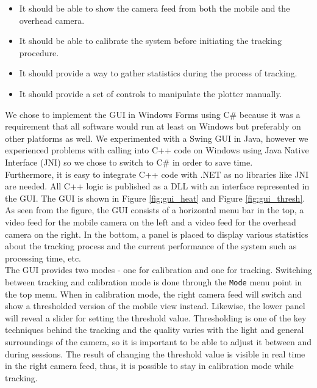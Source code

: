\begin{itemize}
  \item{It should be able to show the camera feed from both the mobile and the overhead camera}.
  \item{It should be able to calibrate the system before initiating the tracking procedure}.
  \item{It should provide a way to gather statistics during the process of tracking}.
  \item{It should provide a set of controls to manipulate the plotter manually}.
\end{itemize}

We chose to implement the GUI in Windows Forms using C\# because it was a requirement that all software would run at least on Windows but preferably on other platforms as well. We experimented with a Swing GUI in Java, however we experienced problems with calling into C++ code on Windows using Java Native Interface (JNI) \cite{jni} so we chose to switch to C\# in order to save time. \\

Furthermore, it is easy to integrate C++ code with .NET as no libraries like JNI are needed. All C++ logic is published as a DLL with an interface represented in the GUI. The GUI is shown in Figure \ref{fig:gui_heat} and Figure \ref{fig:gui_thresh}. \\

As seen from the figure, the GUI consists of a horizontal menu bar in the top, a video feed for the mobile camera on the left and a video feed for the overhead camera on the right. In the bottom, a panel is placed to display various statistics about the tracking process and the current performance of the system such as processing time, etc. \\

The GUI provides two modes - one for calibration and one for tracking. Switching between tracking and calibration mode is done through the \texttt{Mode} menu point in the top menu. When in calibration mode, the right camera feed will switch and show a thresholded version of the mobile view instead. Likewise, the lower panel will reveal a slider for setting the threshold value. Thresholding is one of the key techniques behind the tracking and the quality varies with the light and general surroundings of the camera, so it is important to be able to adjust it between and during sessions. The result of changing the threshold value is visible in real time in the right camera feed, thus, it is possible to stay in calibration mode while tracking. \\

